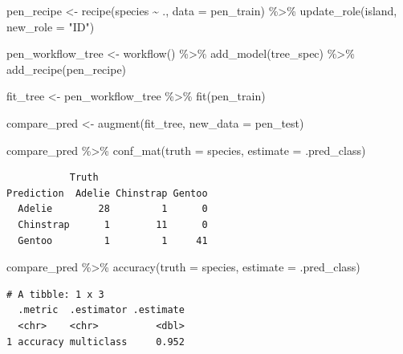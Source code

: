 \documentclass[
  letterpaper,
  DIV=11,
  numbers=noendperiod]{scrreprt}
\newenvironment{Shaded}{\begin{snugshade}}{\end{snugshade}}
\newcommand{\AttributeTok}[1]{\textcolor[rgb]{0.40,0.45,0.13}{#1}}
\newcommand{\FunctionTok}[1]{\textcolor[rgb]{0.28,0.35,0.67}{#1}}
\newcommand{\NormalTok}[1]{\textcolor[rgb]{0.00,0.23,0.31}{#1}}
\newcommand{\OtherTok}[1]{\textcolor[rgb]{0.00,0.23,0.31}{#1}}
\newcommand{\SpecialCharTok}[1]{\textcolor[rgb]{0.37,0.37,0.37}{#1}}
\newcommand{\StringTok}[1]{\textcolor[rgb]{0.13,0.47,0.30}{#1}}
\begin{document}
\begin{Shaded}
\begin{Highlighting}[]
\NormalTok{pen\_recipe }\OtherTok{\textless{}{-}} 
  \FunctionTok{recipe}\NormalTok{(species }\SpecialCharTok{\textasciitilde{}}\NormalTok{ ., }\AttributeTok{data =}\NormalTok{ pen\_train) }\SpecialCharTok{\%\textgreater{}\%} 
  \FunctionTok{update\_role}\NormalTok{(island,  }\AttributeTok{new\_role =} \StringTok{"ID"}\NormalTok{)}

\NormalTok{pen\_workflow\_tree }\OtherTok{\textless{}{-}} \FunctionTok{workflow}\NormalTok{() }\SpecialCharTok{\%\textgreater{}\%}
  \FunctionTok{add\_model}\NormalTok{(tree\_spec) }\SpecialCharTok{\%\textgreater{}\%}
  \FunctionTok{add\_recipe}\NormalTok{(pen\_recipe)}

\NormalTok{fit\_tree }\OtherTok{\textless{}{-}}\NormalTok{ pen\_workflow\_tree }\SpecialCharTok{\%\textgreater{}\%} \FunctionTok{fit}\NormalTok{(pen\_train)}
\end{Highlighting}
\end{Shaded}

\begin{Shaded}
\begin{Highlighting}[]
\NormalTok{compare\_pred }\OtherTok{\textless{}{-}} \FunctionTok{augment}\NormalTok{(fit\_tree, }\AttributeTok{new\_data =}\NormalTok{ pen\_test) }

\NormalTok{compare\_pred }\SpecialCharTok{\%\textgreater{}\%} \FunctionTok{conf\_mat}\NormalTok{(}\AttributeTok{truth =}\NormalTok{ species, }\AttributeTok{estimate =}\NormalTok{ .pred\_class)}
\end{Highlighting}
\end{Shaded}

\begin{verbatim}
           Truth
Prediction  Adelie Chinstrap Gentoo
  Adelie        28         1      0
  Chinstrap      1        11      0
  Gentoo         1         1     41
\end{verbatim}

\begin{Shaded}
\begin{Highlighting}[]
\NormalTok{compare\_pred }\SpecialCharTok{\%\textgreater{}\%}  \FunctionTok{accuracy}\NormalTok{(}\AttributeTok{truth =}\NormalTok{ species, }\AttributeTok{estimate =}\NormalTok{ .pred\_class)}
\end{Highlighting}
\end{Shaded}

\begin{verbatim}
# A tibble: 1 x 3
  .metric  .estimator .estimate
  <chr>    <chr>          <dbl>
1 accuracy multiclass     0.952
\end{verbatim}
\end{document}
